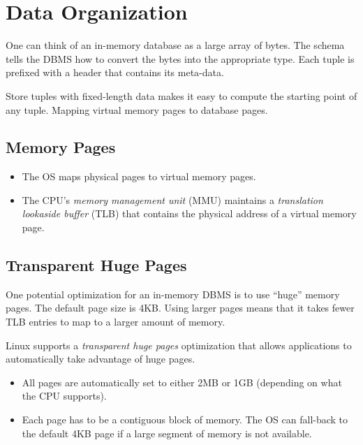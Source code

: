 \documentclass[11pt]{article}
\begin{document}
\maketitle
\thispagestyle{plain}

\section{Data Organization}
One can think of an in-memory database as a large array of bytes.
The schema tells the DBMS how to convert the bytes into the appropriate type.
Each tuple is prefixed with a header that contains its meta-data.

Store tuples with fixed-length data makes it easy to compute the starting point of any tuple.
Mapping virtual memory pages to database pages.

\subsection*{Memory Pages}
\begin{itemize}
    \item
    The OS maps physical pages to virtual memory pages.
    
    \item
    The CPU's \textit{memory management unit} (MMU) maintains a \textit{translation lookaside 
    buffer} (TLB) that contains the physical address of a virtual memory page.
\end{itemize}

\subsection*{Transparent Huge Pages}
One potential optimization for an in-memory DBMS is to use ``huge'' memory pages. The default page 
size is 4KB. Using larger pages means that it takes fewer TLB entries to map to a larger amount of 
memory.

Linux supports a \textit{transparent huge pages} optimization that allows applications to 
automatically take advantage of huge pages.
\begin{itemize}
    \item
    All pages are automatically set to either 2MB or 1GB (depending on what the CPU supports).
    
    \item
    Each page has to be a contiguous block of memory. The OS can fall-back to the default 4KB page 
if     a large segment of memory is not available.
\end{itemize}
\end{document}
